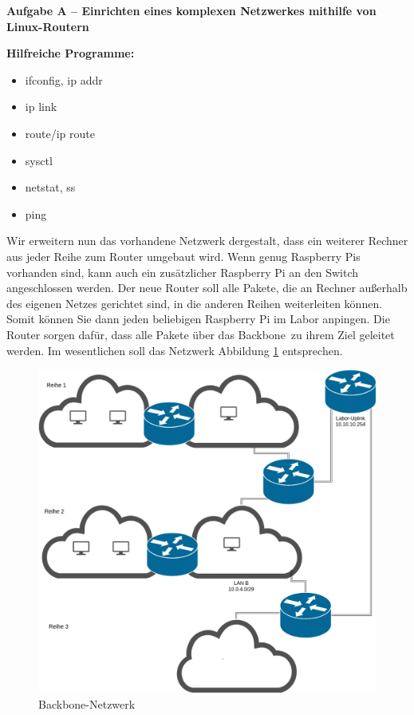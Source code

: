 \documentclass[paper=a4,fontsize=11pt]{scrartcl}%
\numberwithin{equation}{section}
\begin{document}
\begin{center}\Large{\textbf{Aufgabe A -- Einrichten eines komplexen Netzwerkes mithilfe von Linux-Routern}}\end{center}\vskip0.25in
\textbf{Hilfreiche Programme:}
\begin{multicols}{3}
\begin{itemize}
	\item ifconfig, ip addr
	\item ip link
	\item route/ip route
	\item sysctl
	\item netstat, ss
	\item ping
\end{itemize}
\end{multicols}
Wir erweitern nun das vorhandene Netzwerk dergestalt, dass ein weiterer Rechner aus jeder Reihe zum Router umgebaut wird. Wenn genug Raspberry Pis vorhanden sind, kann auch ein zusätzlicher Raspberry Pi an den Switch angeschlossen werden. Der neue Router soll alle Pakete, die an Rechner außerhalb des eigenen Netzes gerichtet sind, in die anderen Reihen weiterleiten können. Somit können Sie dann jeden beliebigen Raspberry Pi im Labor anpingen. Die Router sorgen dafür, dass alle Pakete über das \glqq Backbone\grqq\ zu ihrem Ziel geleitet werden. Im wesentlichen soll das Netzwerk Abbildung \ref{backbone} entsprechen. 
\begin{figure}[H]
	\center
	\includegraphics[scale=0.25]{backbone}
	\caption{Backbone-Netzwerk}
	\label{backbone}
\end{figure}
\end{document}
